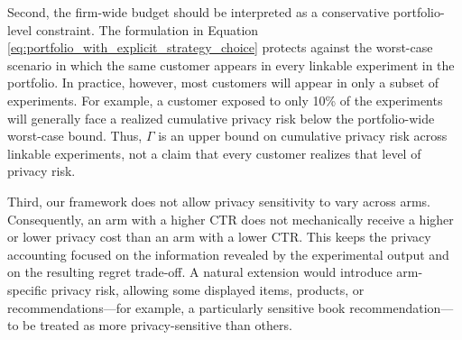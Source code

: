 \documentclass[mksc,nonblindrev]{informs3}
\begin{document}
Second, the firm-wide budget should be interpreted as a conservative portfolio-level constraint. The formulation in Equation \eqref{eq:portfolio_with_explicit_strategy_choice} protects against the worst-case scenario in which the same customer appears in every linkable experiment in the portfolio. In practice, however, most customers will appear in only a subset of experiments. For example, a customer exposed to only 10\% of the experiments will generally face a realized cumulative privacy risk below the portfolio-wide worst-case bound. Thus, $\Gamma$ is an upper bound on cumulative privacy risk across linkable experiments, not a claim that every customer realizes that level of privacy risk.

Third, our framework does not allow privacy sensitivity to vary across arms. Consequently, an arm with a higher CTR does not mechanically receive a higher or lower privacy cost than an arm with a lower CTR. This keeps the privacy accounting focused on the information revealed by the experimental output and on the resulting regret trade-off. A natural extension would introduce arm-specific privacy risk, allowing some displayed items, products, or recommendations—for example, a particularly sensitive book recommendation—to be treated as more privacy-sensitive than others.

\end{document}
